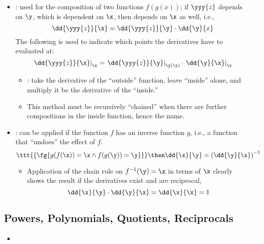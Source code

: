 \begin{itemize}
\begin{itemize}
    \item {}: used for the composition of two functions \(f(g(x))\); if \(\yyy{z}\) depends on \(\y\), which is dependent on \(\x\), then  depends on \(\x\) as well, i.e., 
    \[%
    \dd{\yyy{z}}{\x} = \dd{\yyy{z}}{\y} \cdot \dd{\y}{x}
    \]%
    The following is used to indicate which points the derivatives have to evaluated at:
    \[%
    \left.\dd{\yyy{z}}{\x}\right|_\x = \left.\dd{\yyy{z}}{\y}\right|_{\y(\x)} \cdot \left.\dd{\y}{\x}\right|_\x
    \]%
    \begin{itemize}
      \item {}: take the derivative of the ``outside'' function, leave ``inside'' alone, and multiply it be the derivative of the ``inside.''
      \item This method must be recursively ``chained'' when there are further compositions in the inside function, hence the name. 
    \end{itemize}
  
    \item {}: can be applied if the function \(f\) has an inverse function \(g\), i.e., a function that ``undoes'' the effect of \(f\). 
    \[%
    \ttt{\left\{\fg{g(f(\x)) = \x \land f(g(\y)) = \y}\right\}} \then \dd{\x}{\y} = \left(\dd{\y}{\x}\right)^{-1}
    \]%
      \begin{itemize}
        \item Application of the chain rule on \(f ^{-1} (\y) = \x\) in terms of \(\x\) clearly shows the result if the derivatives exist and are reciprocal, 
        \[%
        \dd{\x}{\y} \cdot \dd{\y}{\x} = \dd{\x}{\x} = 1
        \]%
        
      \end{itemize}
  \end{itemize}
  
  \subsection{Powers, Polynomials, Quotients, Reciprocals}
  \begin{itemize}
    \item 
  \end{itemize}


\end{itemize}
